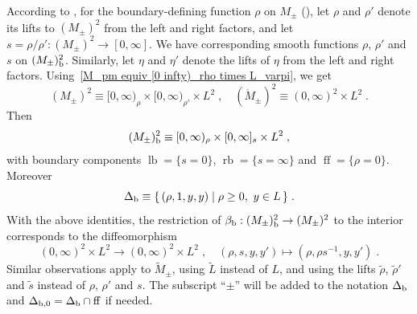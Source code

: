 \documentclass{memo-l}
\theoremstyle{plain}
\theoremstyle{definition}
\theoremstyle{remark}
\newcommand{\lb}{\operatorname{lb}}
\newcommand{\rb}{\operatorname{rb}}
\newcommand{\ff}{\operatorname{ff}}
\newcommand{\Deltab}{\Delta_{\text{\rm b}}}
\numberwithin{section}{chapter}
\numberwithin{equation}{section}%
\begin{document}
According to , for the boundary-defining function $\rho$ on $M_\pm$ (), let $\rho$ and $\rho'$ denote its lifts to $(M_\pm)^2$ from the left and right factors, and let $s=\rho/\rho':(M_\pm)^2\to[0,\infty]$. We have corresponding smooth functions $\rho$, $\rho'$ and $s$ on $(M_\pm)^2_{\text{\rm b}}$. Similarly, let $\eta$ and $\eta'$ denote the lifts of $\eta$ from the left and right factors. Using~\eqref{M_pm equiv [0 infty)_rho times L_varpi}, we get
\[
(M_\pm)^2\equiv[0,\infty)_\rho\times[0,\infty)_{\rho'}\times L^2\;,\quad
(\mathring M_\pm)^2\equiv(0,\infty)^2\times L^2\;.
\]
Then
\[
(M_\pm)^2_{\text{\rm b}}\equiv[0,\infty)_\rho\times[0,\infty]_s\times L^2\;,
\]
with boundary components $\lb=\{s=0\}$, $\rb=\{s=\infty\}$ and $\ff=\{\rho=0\}$. Moreover
\[
\Deltab\equiv\{\,(\rho,1,y,y)\mid\rho\ge0,\ y\in L\,\}\;.
\]
With the above identities, the restriction of $\beta_{\text{\rm b}}: (M_\pm)^2_{\text{\rm b}}\to (M_\pm)^2$ to the interior corresponds to the diffeomorphism
\[
(0,\infty)^2\times L^2\to(0,\infty)^2\times L^2\;,\quad(\rho, s,y,y')\mapsto(\rho,\rho s^{-1}, y, y')\;.
\]
Similar observations apply to $\widetilde M_\pm$, using $\widetilde L$ instead of $L$, and using the lifts $\tilde\rho$, $\tilde\rho'$ and $\tilde s$ instead of $\rho$, $\rho'$ and $s$. The subscript ``$\pm$'' will be added to the notation $\Deltab$ and $\Delta_{\text{\rm b},0}=\Deltab\cap\ff$ if needed.
\end{document}
